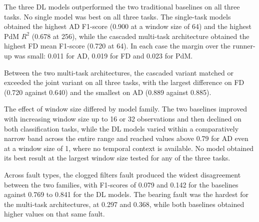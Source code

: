 The three DL models outperformed the two traditional baselines on all three tasks.
No single model was best on all three tasks. The single-task models obtained the highest AD
F1-score (0.900 at a window size of 64) and the highest PdM $R^2$ (0.678 at 256), while
the cascaded multi-task architecture obtained the highest FD mean F1-score (0.720 at 64). In
each case the margin over the runner-up was small: 0.011 for AD, 0.019 for FD
and 0.023 for PdM.

Between the two multi-task architectures, the cascaded variant matched or exceeded the joint variant on
all three tasks, with the largest difference on FD (0.720 against 0.640) and the smallest on
AD (0.889 against 0.885).

The effect of window size differed by model family. The two baselines improved with increasing window size
up to 16 or 32 observations and then declined on both classification tasks, while the DL models
varied within a comparatively narrow band across the entire range and reached values above 0.79 for
AD even at a window size of 1, where no temporal context is available. No model obtained
its best result at the largest window size tested for any of the three tasks.

Across fault types, the clogged filters fault produced the widest disagreement between the two families,
with F1-scores of 0.079 and 0.142 for the baselines against 0.769 to 0.841 for the DL models.
The bearing fault was the hardest for the multi-task architectures, at 0.297 and 0.368, while both
baselines obtained higher values on that same fault.